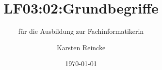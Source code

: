 \documentclass[]{beamer}
\title{LF03:02:Grundbegriffe}
\subtitle{für die Ausbildung zur Fachinformatikerin}
\institute[GS-LDK]{Gewerbliche Schulen Dillenburg}
\author{Karsten Reincke}
\date{\today}
\def\cfgGl{../../../cfg.gl/}
\begin{document}

\begin{frame}
  \titlepage

  
\end{frame}






\logo{}
\newpage



%
\end{document}
